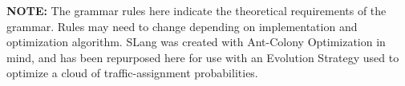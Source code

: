 \documentclass[11pt]{article}
\begin{document}
\begin{enumerate}

\production {} \arr {}

\production {} \arr {}


\production {} \arr {}

\production {} \arr {}




\bigskip
\bigskip

\textbf{\LARGE{NOTE:}} The grammar rules here indicate the theoretical requirements of the grammar. Rules may need to change depending on implementation and optimization algorithm. SLang was created with Ant-Colony Optimization in mind, and has been repurposed here for use with an Evolution Strategy used to optimize a cloud of traffic-assignment probabilities. 

\end{enumerate}
\end{document}
